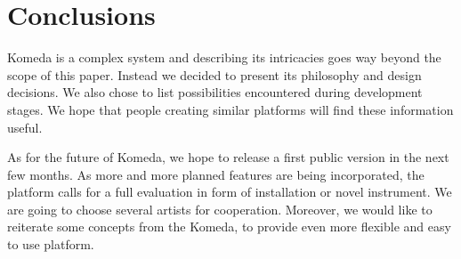 \documentclass{article}
\begin{document}
\section{Conclusions}

Komeda is a complex system and describing its intricacies goes way beyond the
scope of this paper. Instead we decided to present its philosophy and design
decisions. We also chose to list possibilities encountered during development
stages. We hope that people creating similar platforms will find these
information useful.

As for the future of Komeda, we hope to release a first public version in the
next few months. As more and more planned features are being incorporated, the
platform calls for a full evaluation in form of installation or novel
instrument. We are going to choose several artists for cooperation. Moreover,
we would like to reiterate some concepts from the Komeda, to provide even more
flexible and easy to use platform.


\end{document}
